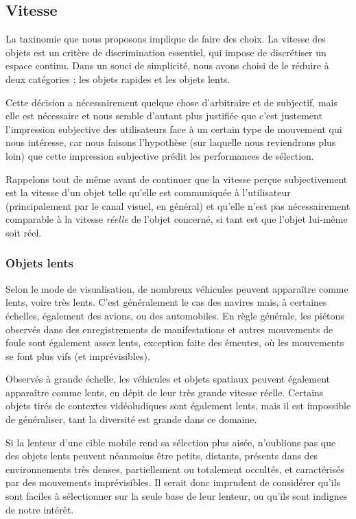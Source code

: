 	\subsection{Vitesse}
	La taxinomie que nous proposons implique de faire des choix. La vitesse des objets est un critère de discrimination essentiel, qui impose de discrétiser un espace continu. Dans un souci de simplicité, nous avons choisi de le réduire à deux catégories : les objets rapides et les objets lents.
	
	Cette décision a nécessairement quelque chose d'arbitraire et de subjectif, mais elle est nécessaire et nous semble d'autant plus justifiée que c'est justement l'impression subjective des utilisateurs face à un certain type de mouvement qui nous intéresse, car nous faisons l'hypothèse (sur laquelle nous reviendrons plus loin) que cette impression subjective prédit les performances de sélection.
	
	Rappelons tout de même avant de continuer que la vitesse perçue subjectivement est la vitesse d'un objet telle qu'elle est communiquée à l'utilisateur (principalement par le canal visuel, en général) et qu'elle n'est pas nécessairement comparable à la vitesse \emph{réelle} de l'objet concerné, si tant est que l'objet lui-même soit réel.
	
	\subsubsection{Objets lents}
	Selon le mode de visualisation, de nombreux véhicules peuvent apparaître comme lents, voire très lents. C'est généralement le cas des navires mais, à certaines échelles, également des avions, ou des automobiles. En règle générale, les piétons observés dans des enregistrements de manifestations et autres mouvements de foule sont également assez lents, exception faite des émeutes, où les mouvements se font plus vifs (et imprévisibles).
	
	Observés à grande échelle, les véhicules et objets spatiaux peuvent également apparaître comme lents, en dépit de leur très grande vitesse réelle. Certains objets tirés de contextes vidéoludiques sont également lents, mais il est impossible de généraliser, tant la diversité est grande dans ce domaine.
	
	Si la lenteur d'une cible mobile rend sa sélection plus aisée, n'oublions pas que des objets lents peuvent néanmoins être petits, distants, présents dans des environnements très denses, partiellement ou totalement occultés, et caractérisés par des mouvements imprévisibles. Il serait donc imprudent de considérer qu'ils sont \og faciles \fg{} à sélectionner sur la seule base de leur lenteur, ou qu'ils sont indignes de notre intérêt.
	
